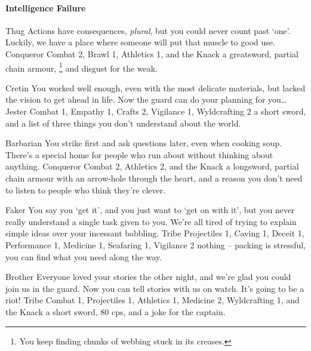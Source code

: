 \begin{multicols}{2}
\begin{itemize}
\end{itemize}

\paragraph{Intelligence Failure}

\begin{itemize}

  {Thug}%
  {Actions have consequences, \emph{plural}, but you could never count past `one'.
  Luckily, we have a place where someone will put that muscle to good use.
  }%
  {Conqueror}%
  {Combat 2, Brawl 1, Athletics 1, and the Knack \adrenalinesurge}%
  {a greatsword, partial chain armour,%
  \footnote{You keep finding chunks of webbing stuck in its creases.}
  and disgust for the weak.}%

  {Cretin}%
  {You worked well enough, even with the most delicate materials, but lacked the vision to get ahead in life.
  Now the \gls{guard} can do your planning for you\ldots
  }%
  {Jester}%
  {Combat 1, Empathy 1, Crafts 2, Vigilance 1, Wyldcrafting 2}%
  {a short sword, and a list of three things you don't understand about the world.}%


  {Barbarian}%
  {You strike first and ask questions later, even when cooking soup.
  There's a special home for people who run about without thinking about anything.
  }%
  {Conqueror}%
  {Combat 2, Athletics 2, and the Knack \laststand}%
  {a longsword, partial chain armour with an arrow-hole through the heart, and a reason you don't need to listen to people who think they're clever.}%


  {Faker}%
  {You say you `get it', and you just want to `get on with it', but you never really understand a single task given to you.
  We're all tired of trying to explain simple ideas over your incessant babbling.
  }%
  {Tribe}%
  {Projectiles 1, Caving 1, Deceit 1, Performance 1, Medicine 1, Seafaring 1, Vigilance 2}%
  {nothing -- packing is stressful, you can find what you need along the way.}%

  {Brother}%
  {Everyone loved your stories the other night, and we're glad you could join us in the \gls{guard}.
  Now you can tell stories with us on watch.
  It's going to be a riot!
  }%
  {Tribe}%
  {Combat 1, Projectiles 1, Athletics 1, Medicine 2, Wyldcrafting 1, and the Knack \guardian}%
  {a short sword, 80 \glspl{cp}, and a joke for the captain.}%



\end{itemize}
\end{multicols}
